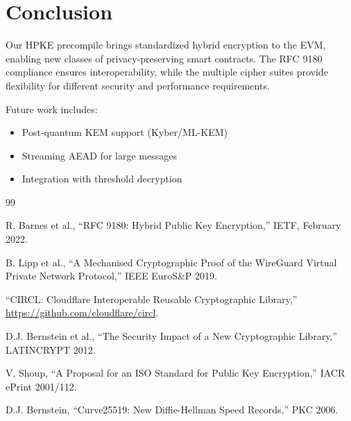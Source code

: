 \documentclass[11pt,a4paper]{article}
\theoremstyle{definition}
\begin{document}
\section{Conclusion}

Our HPKE precompile brings standardized hybrid encryption to the EVM, enabling new classes of privacy-preserving smart contracts. The RFC 9180 compliance ensures interoperability, while the multiple cipher suites provide flexibility for different security and performance requirements.

Future work includes:
\begin{itemize}
\item Post-quantum KEM support (Kyber/ML-KEM)
\item Streaming AEAD for large messages
\item Integration with threshold decryption
\end{itemize}


\begin{thebibliography}{99}

R. Barnes et al., ``RFC 9180: Hybrid Public Key Encryption,'' IETF, February 2022.

B. Lipp et al., ``A Mechanised Cryptographic Proof of the WireGuard Virtual Private Network Protocol,'' IEEE EuroS\&P 2019.

``CIRCL: Cloudflare Interoperable Reusable Cryptographic Library,'' \url{https://github.com/cloudflare/circl}.

D.J. Bernstein et al., ``The Security Impact of a New Cryptographic Library,'' LATINCRYPT 2012.

V. Shoup, ``A Proposal for an ISO Standard for Public Key Encryption,'' IACR ePrint 2001/112.

D.J. Bernstein, ``Curve25519: New Diffie-Hellman Speed Records,'' PKC 2006.

\end{thebibliography}
\end{document}

